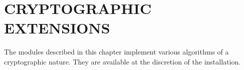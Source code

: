\chapter{CRYPTOGRAPHIC EXTENSIONS}

The modules described in this chapter implement various algorithms of
a cryptographic nature.  They are available at the discretion of the
installation. 


